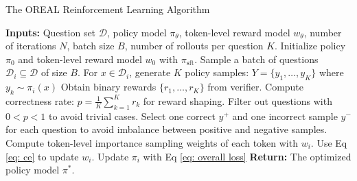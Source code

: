 \begin{algorithm}[htbp]
\caption{The OREAL Reinforcement Learning Algorithm}
\begin{algorithmic}[1]
\STATE \textbf{Inputs:} Question set $\mathcal{D}$, policy model $\pi_\theta$, token-level reward model $w_\theta$, number of iterations $N$, batch size $B$, number of rollouts per question $K$.
\STATE Initialize policy $\pi_0$ and token-level reward model $w_0$ with $\pi_{\text{sft}}$.
    \STATE Sample a batch of questions $\mathcal{D}_i \subseteq \mathcal{D}$ of size $B$.
    \STATE For $x \in \mathcal{D}_i$, generate $K$ policy samples: $Y = \{y_1, \dots, y_K\}$ where $y_k \sim \pi_i(x)$
    \STATE Obtain binary rewards $ \{r_1, \dots, r_K\}$ from verifier.
    \STATE Compute correctness rate: $p = \frac{1}{K} \sum_{k=1}^{K} r_k$ for reward shaping.
    \STATE Filter out questions with $0 < p < 1$ to avoid trivial cases.
    \STATE Select one correct $y^+$ and one incorrect sample $y^-$ for each question to avoid imbalance between positive and negative samples.
    \STATE Compute token-level importance sampling weights of each token with $w_i$.
    \STATE Use Eq \eqref{eq: ce} to update $w_i$.
    \STATE Update $\pi_i$ with Eq \eqref{eq: overall loss}
\ENDFOR
\STATE \textbf{Return:} The optimized policy model $\pi^*$.
\end{algorithmic}
\label{alg:oreal}
\end{algorithm}
